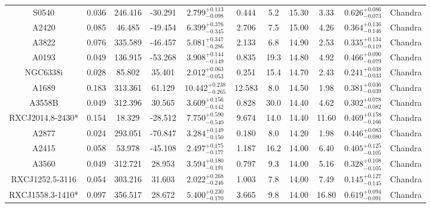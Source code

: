 \documentclass{aa}   %
\begin{document}
\begin{table}[h!]
\begin{center}
\begin{tabular}{ c  c  c  c c c c c c c c }
S0540               		&		0.036	&	246.416	&	-30.291	& $	2.799^{+0.113}_{-0.098}$  &      0.444	&  5.2	&	15.30	&	3.33	&	$ 0.626^{+0.086}_{-0.073}  $ &	  Chandra     \\
A2420               		&		0.085	&	46.485	&	-49.454	& $	6.399^{+0.376}_{-0.345}$  &      2.706	&  7.5	&	15.00	&	4.26	&	$ 0.364^{+0.136}_{-0.146}  $ &	  Chandra     \\
A3822               		&		0.076	&	335.589	&	-46.457	& $	5.081^{+0.347}_{-0.286}$  &      2.133	&  6.8	&	14.90	&	2.53	&	$ 0.335^{+0.134}_{-0.119}  $ &	  Chandra     \\
A0193               		&		0.049	&	136.915	&	-53.268	& $	3.908^{+0.144}_{-0.149}$  &      0.835	&  19.3	&	14.80	&	4.92	&	$ 0.466^{+0.090}_{-0.079}  $ &	  Chandra     \\
NGC6338i            		&		0.028	&	85.802	&	35.401	& $	2.012^{+0.063}_{-0.053}$  &      0.251	&  15.4	&	14.70	&	2.43	&	$ 0.241^{+0.038}_{-0.033}  $ &	  Chandra     \\
A1689               		&		0.183	&	313.361	&	61.129	& $ 10.442^{+0.238}_{-0.265}$ &     12.583	&  8.0	&	14.50	&	1.98	&	$ 0.381^{+0.036}_{-0.039}  $ &	  Chandra     \\
A3558B              		&		0.049	&	312.396	&	30.565	& $	3.609^{+0.156}_{-0.142}$  &      0.828	&  30.0	&	14.40	&	4.62	&	$ 0.302^{+0.078}_{-0.082}  $ &	 Chandra      \\
RXCJ2014.8-2430*    		&		0.154	&	18.329	&	-28.512	& $	7.750^{+0.590}_{-0.540}$  &      9.674	&  14.0	&	14.40	&	11.60	&	$ 0.469^{+0.158}_{-0.166}  $ &	 Chandra      \\
A2877               		&		0.024	&	293.051	&	-70.847	& $	3.284^{+0.149}_{-0.150}$  &      0.180	&  8.0	&	14.20	&	1.98	&	$ 0.446^{+0.083}_{-0.080}  $ &	  Chandra     \\
A2415               		&		0.058	&	53.978	&	-45.108	& $	2.497^{+0.175}_{-0.177}$  &      1.187	&  16.2	&	14.00	&	6.40	&	$ 0.405^{+0.125}_{-0.105}  $ &	 Chandra      \\
A3560               		&		0.049	&	312.721	&	28.953	& $	3.594^{+0.180}_{-0.191}$  &      0.797	&  9.3	&	14.00	&	5.16	&	$ 0.328^{+0.108}_{-0.105}  $ &	 Chandra      \\
RXCJ1252.5-3116     		&		0.054	&	303.216	&	31.603	& $	2.022^{+0.268}_{-0.246}$  &      1.003	&  7.8	&	14.00	&	7.49	&	$ 0.145^{+0.127}_{-0.145}  $ &	 Chandra      \\
RXCJ1558.3-1410*    		&		0.097	&	356.517	&	28.672	& $	5.400^{+0.230}_{-0.170}$  &      3.665	&  9.8	&	14.00	&	16.80	&	$ 0.619^{+0.094}_{-0.091}  $ &	 Chandra      \\

\end{tabular}
\end{center}
\end{table}
\end{document}
